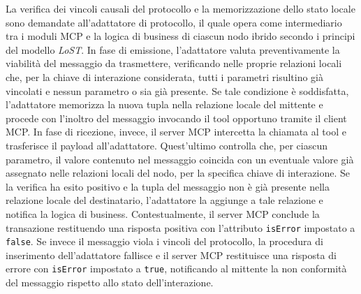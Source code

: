 La verifica dei vincoli causali del protocollo e la memorizzazione dello stato locale sono demandate all'adattatore di protocollo, il quale opera come intermediario tra i moduli MCP e la logica di business di ciascun nodo ibrido secondo i principi del modello \emph{LoST}. In fase di emissione, l'adattatore valuta preventivamente la viabilità del messaggio da trasmettere, verificando nelle proprie relazioni locali che, per la chiave di interazione considerata, tutti i parametri  risultino già vincolati e nessun parametro  o  sia già presente. Se tale condizione è soddisfatta, l'adattatore memorizza la nuova tupla nella relazione locale del mittente e procede con l'inoltro del messaggio invocando il tool opportuno tramite il client MCP. In fase di ricezione, invece, il server MCP intercetta la chiamata al tool e trasferisce il payload all'adattatore. 
Quest'ultimo controlla che, per ciascun parametro, il valore contenuto nel messaggio coincida con un eventuale valore già assegnato nelle relazioni locali del nodo, per la specifica chiave di interazione.
Se la verifica ha esito positivo e la tupla del messaggio non è già presente nella relazione locale del destinatario, l'adattatore la aggiunge a tale relazione e notifica la logica di business. Contestualmente, il server MCP conclude la transazione restituendo una risposta positiva con l'attributo \lstinline|isError| impostato a \lstinline|false|. Se invece il messaggio viola i vincoli del protocollo, la procedura di inserimento dell'adattatore fallisce e il server MCP restituisce una risposta di errore con \lstinline|isError| impostato a \lstinline|true|, notificando al mittente la non conformità del messaggio rispetto allo stato dell'interazione.

